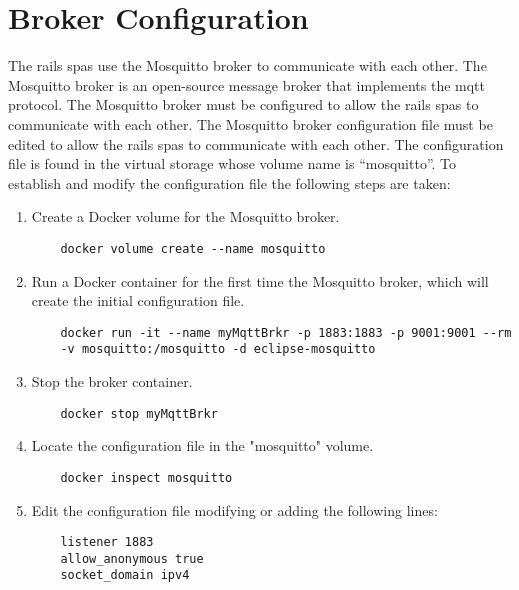\section{Broker Configuration}
\label{sec:brokerconfig}
The \gls{rails} \glspl{spa} use the Mosquitto broker to communicate with each other. The Mosquitto broker is an open-source message broker that implements the \gls{mqtt} protocol. The Mosquitto broker must be configured to allow the \gls{rails} \glspl{spa} to communicate with each other. The Mosquitto broker configuration file must be edited to allow the \gls{rails} \glspl{spa} to communicate with each other. The configuration file is found in the virtual storage whose volume name is “mosquitto”. To establish and modify the configuration file the following steps are taken:
\begin{enumerate}
    \item Create a Docker volume for the Mosquitto broker.
    \begin{verbatim}
    docker volume create --name mosquitto
    \end{verbatim}
    \item Run a Docker container for the first time the Mosquitto broker, which will create the initial configuration file.
    \begin{verbatim}
    docker run -it --name myMqttBrkr -p 1883:1883 -p 9001:9001 --rm
    -v mosquitto:/mosquitto -d eclipse-mosquitto
    \end{verbatim}
    \item Stop the broker container.
    \begin{verbatim}    
    docker stop myMqttBrkr
    \end{verbatim}
    \item Locate the configuration file in the "mosquitto" volume.
    \begin{verbatim}    
    docker inspect mosquitto
    \end{verbatim}
    \item Edit the configuration file modifying or adding the following lines:
    \begin{verbatim}
    listener 1883
    allow_anonymous true
    socket_domain ipv4
    \end{verbatim}
\end{enumerate}
